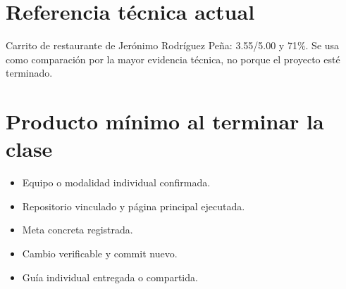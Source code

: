 \documentclass[10pt,a4paper]{article}
\begin{document}
\section*{Referencia técnica actual}
Carrito de restaurante de Jerónimo Rodríguez Peña: 3.55/5.00 y 71\%. Se usa como comparación por la mayor evidencia técnica, no porque el proyecto esté terminado.
\section*{Producto mínimo al terminar la clase}
\begin{itemize}
\item Equipo o modalidad individual confirmada.
\item Repositorio vinculado y página principal ejecutada.
\item Meta concreta registrada.
\item Cambio verificable y commit nuevo.
\item Guía individual entregada o compartida.
\end{itemize}
\end{document}
